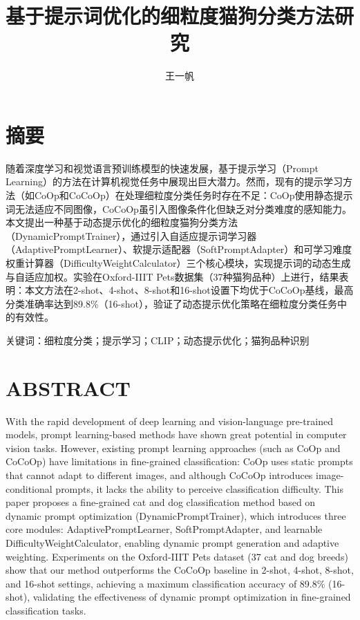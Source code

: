\documentclass{HDU-Bachelor-Thesis}
\title{基于提示词优化的细粒度猫狗分类方法研究}
\author{王一帆}
\begin{document}
\pagestyle{empty}

\maketitle

\clearpage
\pagestyle{HDU-bachelor-empty}

\section*{摘\hspace{2em}要}

随着深度学习和视觉语言预训练模型的快速发展，基于提示学习（Prompt Learning）的方法在计算机视觉任务中展现出巨大潜力。然而，现有的提示学习方法（如CoOp和CoCoOp）在处理细粒度分类任务时存在不足：CoOp使用静态提示词无法适应不同图像，CoCoOp虽引入图像条件化但缺乏对分类难度的感知能力。本文提出一种基于动态提示优化的细粒度猫狗分类方法（DynamicPromptTrainer），通过引入自适应提示词学习器（AdaptivePromptLearner）、软提示适配器（SoftPromptAdapter）和可学习难度权重计算器（DifficultyWeightCalculator）三个核心模块，实现提示词的动态生成与自适应加权。实验在Oxford-IIIT Pets数据集（37种猫狗品种）上进行，结果表明：本文方法在2-shot、4-shot、8-shot和16-shot设置下均优于CoCoOp基线，最高分类准确率达到89.8\%（16-shot），验证了动态提示优化策略在细粒度分类任务中的有效性。

\vspace{\baselineskip}\noindent
\textsf{关键词：}细粒度分类；提示学习；CLIP；动态提示优化；猫狗品种识别

\clearpage
\section*{\textbf{ABSTRACT}}

With the rapid development of deep learning and vision-language pre-trained models, prompt learning-based methods have shown great potential in computer vision tasks. However, existing prompt learning approaches (such as CoOp and CoCoOp) have limitations in fine-grained classification: CoOp uses static prompts that cannot adapt to different images, and although CoCoOp introduces image-conditional prompts, it lacks the ability to perceive classification difficulty. This paper proposes a fine-grained cat and dog classification method based on dynamic prompt optimization (DynamicPromptTrainer), which introduces three core modules: AdaptivePromptLearner, SoftPromptAdapter, and learnable DifficultyWeightCalculator, enabling dynamic prompt generation and adaptive weighting. Experiments on the Oxford-IIIT Pets dataset (37 cat and dog breeds) show that our method outperforms the CoCoOp baseline in 2-shot, 4-shot, 8-shot, and 16-shot settings, achieving a maximum classification accuracy of 89.8\% (16-shot), validating the effectiveness of dynamic prompt optimization in fine-grained classification tasks.
\end{document}
